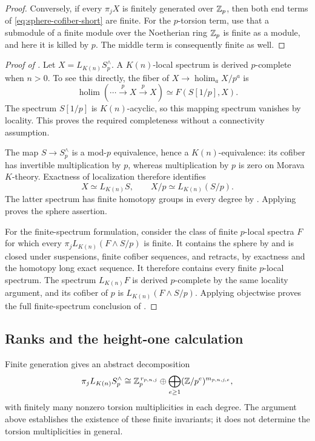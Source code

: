 \begin{proof}
Conversely, if every $\pi_jX$ is finitely generated over $\mathbb Z_p$, then
both end terms of \eqref{eq:sphere-cofiber-short} are finite.  For the
$p$-torsion term, use that a submodule of a finite module over the
Noetherian ring $\mathbb Z_p$ is finite as a module, and here it is killed by
$p$.  The middle term is consequently finite as well.
\end{proof}

\begin{proof}[Proof of ]
Let $X=L_{K(n)}S_p^\wedge$.  A $K(n)$-local spectrum is derived
$p$-complete when $n>0$.  To see this directly, the fiber of
$X\to\operatorname*{holim}_aX/p^a$ is
\[
 \operatorname*{holim}(\cdots\xrightarrow{p}X\xrightarrow{p}X)
 \simeq F(S[1/p],X).
\]
The spectrum $S[1/p]$ is $K(n)$-acyclic, so this mapping spectrum
vanishes by locality.  This proves the required completeness without a
connectivity assumption.

The map $S\to S_p^\wedge$ is a mod-$p$ equivalence, hence a
$K(n)$-equivalence: its cofiber has invertible multiplication by $p$,
whereas multiplication by $p$ is zero on Morava $K$-theory.  Exactness
of localization therefore identifies
\[
 X\simeq L_{K(n)}S,\qquad X/p\simeq L_{K(n)}(S/p).
\]
The latter spectrum has finite homotopy groups in every degree by
.  Applying  proves the sphere assertion.

For the finite-spectrum formulation, consider the class of finite
$p$-local spectra $F$ for which every
$\pi_j L_{K(n)}(F\wedge S/p)$ is finite. It contains the sphere by
 and is closed under suspensions, finite cofiber
sequences, and retracts, by exactness and the homotopy long exact
sequence. It therefore contains every finite $p$-local spectrum.
The spectrum $L_{K(n)}F$ is derived $p$-complete by the same locality
argument, and its cofiber of $p$ is $L_{K(n)}(F\wedge S/p)$.
Applying  objectwise proves the full
finite-spectrum conclusion of .
\end{proof}

\subsection{Ranks and the height-one calculation}

Finite generation gives an abstract decomposition
\[
 \pi_jL_{K(n)}S_p^\wedge
 \cong\mathbb Z_p^{\,r_{p,n,j}}
   \oplus\bigoplus_{e\geq1}
          (\mathbb Z/p^e)^{m_{p,n,j,e}},
\]
with finitely many nonzero torsion multiplicities in each degree.  The
argument above establishes the existence of these finite invariants;
it does not determine the torsion multiplicities in general.


